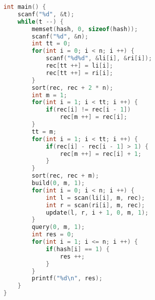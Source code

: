 \begin{lstlisting}[language=c++]
int main() {
    scanf("%d", &t);
    while(t --) {
        memset(hash, 0, sizeof(hash));
        scanf("%d", &n);
        int tt = 0;
        for(int i = 0; i < n; i ++) {
            scanf("%d%d", &li[i], &ri[i]);
            rec[tt ++] = li[i];
            rec[tt ++] = ri[i];
        }
        sort(rec, rec + 2 * n);
        int m = 1;
        for(int i = 1; i < tt; i ++) {
            if(rec[i] != rec[i - 1])
                rec[m ++] = rec[i];
        }
        tt = m;
        for(int i = 1; i < tt; i ++) {
            if(rec[i] - rec[i - 1] > 1) {
                rec[m ++] = rec[i] + 1;
            }
        }
        sort(rec, rec + m);
        build(0, m, 1);
        for(int i = 0; i < n; i ++) {
            int l = scan(li[i], m, rec);
            int r = scan(ri[i], m, rec);
            update(l, r, i + 1, 0, m, 1);
        }
        query(0, m, 1);
        int res = 0;
        for(int i = 1; i <= n; i ++) {
            if(hash[i] == 1) {
                res ++;
            }
        }
        printf("%d\n", res);
    }
}
    \end{lstlisting}
